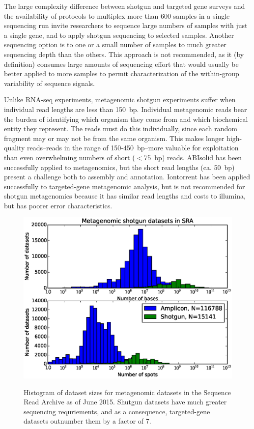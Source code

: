 \documentclass[graybox]{svmult}
\begin{document}
The large complexity difference between shotgun and targeted gene surveys and the availability of protocols to multiplex more than 600 samples in a single sequencing run invite researchers to sequence large numbers of samples with just a single gene, and to apply shotgun sequencing to selected samples.   Another sequencing option is to one or a small number of samples to much greater sequencing depth than the others.  This approach is not recommended, as it (by definition) consumes large amounts of sequencing effort that would usually be better applied to more samples to permit characterization of the within-group variability of sequence signals.

Unlike RNA-seq experiments, metagenomic shotgun experiments suffer when individual read lengths are less than 150~bp.  Individual metagenomic reads bear the burden of identifying which organism they come from and which biochemical entity they represent.  The reads must do this individually, since each random fragment may or may not be from the same organism.  This makes longer high-quality reads--reads in the range of 150-450~bp--more valuable for exploitation than even overwhelming numbers of short ($<$75~bp) reads.   
ABIsolid has been successfully applied to metagenomics\cite{Iverson2012Untangling}, but the short read lengths (ca. 50~bp) present a challenge both to assembly and annotation.
Iontorrent has been applied successfully to targeted-gene metagenomic analysis, but is not recommended for shotgun metagenomics because it has similar read lengths and costs to illumina, but has poorer error characteristics.

\begin{figure}[t]
\caption{Histogram of dataset sizes for metagenomic datasets in the Sequence Read Archive as of June 2015.  Shutgun datasets have much greater sequencing requriements, and as a consequence, targeted-gene  datasets outnumber them by a factor of 7.  }
\includegraphics[width=11.5cm]{imgs/histogram.eps}
%
\label{fig:1}       %
\end{figure}
\end{document}
